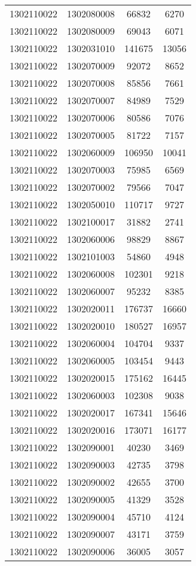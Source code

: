 \begin{longtable}{llcc}
1302110022 & 1302080008 & 66832 & 6270\\
1302110022 & 1302080009 & 69043 & 6071\\
1302110022 & 1302031010 & 141675 & 13056\\
1302110022 & 1302070009 & 92072 & 8652\\
1302110022 & 1302070008 & 85856 & 7661\\
1302110022 & 1302070007 & 84989 & 7529\\
1302110022 & 1302070006 & 80586 & 7076\\
1302110022 & 1302070005 & 81722 & 7157\\
1302110022 & 1302060009 & 106950 & 10041\\
1302110022 & 1302070003 & 75985 & 6569\\
1302110022 & 1302070002 & 79566 & 7047\\
1302110022 & 1302050010 & 110717 & 9727\\
1302110022 & 1302100017 & 31882 & 2741\\
1302110022 & 1302060006 & 98829 & 8867\\
1302110022 & 1302101003 & 54860 & 4948\\
1302110022 & 1302060008 & 102301 & 9218\\
1302110022 & 1302060007 & 95232 & 8385\\
1302110022 & 1302020011 & 176737 & 16660\\
1302110022 & 1302020010 & 180527 & 16957\\
1302110022 & 1302060004 & 104704 & 9337\\
1302110022 & 1302060005 & 103454 & 9443\\
1302110022 & 1302020015 & 175162 & 16445\\
1302110022 & 1302060003 & 102308 & 9038\\
1302110022 & 1302020017 & 167341 & 15646\\
1302110022 & 1302020016 & 173071 & 16177\\
1302110022 & 1302090001 & 40230 & 3469\\
1302110022 & 1302090003 & 42735 & 3798\\
1302110022 & 1302090002 & 42655 & 3700\\
1302110022 & 1302090005 & 41329 & 3528\\
1302110022 & 1302090004 & 45710 & 4124\\
1302110022 & 1302090007 & 43171 & 3759\\
1302110022 & 1302090006 & 36005 & 3057\\

\end{longtable}
